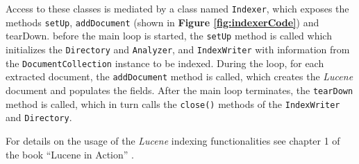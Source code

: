 \documentclass[a4paper]{usiinfbachelorproject}
\begin{document}
Access to these classes is mediated by a class named \texttt{Indexer}, which exposes the methods
\texttt{setUp}, \texttt{addDocument} (shown in \textbf{Figure \ref{fig:indexerCode}})
 and tearDown. before the main loop is started, the \texttt{setUp} method is called which
initializes the \texttt{Directory} and \texttt{Analyzer}, and \texttt{IndexWriter} with information from
the \texttt{DocumentCollection} instance to be indexed. During the loop, for each extracted document, the
\texttt{addDocument} method is called, which creates the \emph{Lucene} document and populates the fields.
After the main loop terminates, the \texttt{tearDown} method is called, which
in turn calls the \texttt{close()} methods of the \texttt{IndexWriter} and \texttt{Directory}.

For details on the usage of the \emph{Lucene} indexing functionalities see chapter 1 of the book
``Lucene in Action'' \cite{luceneInAction}.
\end{document}
